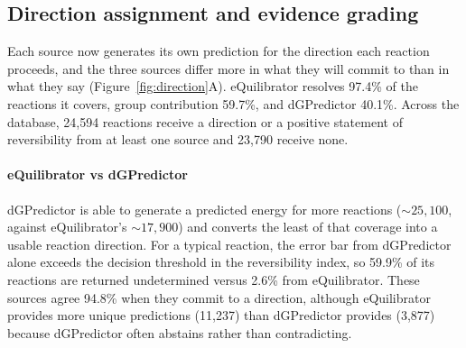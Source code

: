 \subsection{Direction assignment and evidence grading}\label{sec:results-direction}

Each source now generates its own prediction for the direction each reaction proceeds, and the three sources differ more in what they will commit to than in what they say (Figure~\ref{fig:direction}A).
eQuilibrator resolves 97.4\% of the reactions it covers, group contribution 59.7\%, and dGPredictor 40.1\%.
Across the database, 24,594 reactions receive a direction or a positive statement of reversibility from at least one source and 23,790 receive none.

\paragraph{eQuilibrator vs dGPredictor} dGPredictor is able to generate a predicted energy for more reactions ($\sim25,100$, against eQuilibrator's $\sim17,900$) and converts the least of that coverage into a usable reaction direction.
For a typical reaction, the error bar from dGPredictor alone exceeds the decision threshold in the reversibility index, so 59.9\% of its reactions are returned undetermined versus 2.6\% from eQuilibrator.
These sources agree 94.8\% when they commit to a direction, although eQuilibrator provides more unique predictions (11,237) than dGPredictor provides (3,877) because dGPredictor often abstains rather than contradicting.

